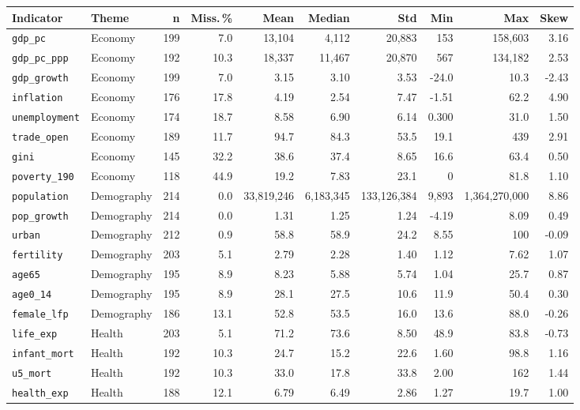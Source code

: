 \footnotesize
\begin{tabular}{llrrrrrrrr}
\toprule
Indicator & Theme & n & Miss.\,\% & Mean & Median & Std & Min & Max & Skew \\
\midrule
\texttt{gdp\_pc} & Economy & 199 & 7.0 & 13,104 & 4,112 & 20,883 & 153 & 158,603 & 3.16 \\
\texttt{gdp\_pc\_ppp} & Economy & 192 & 10.3 & 18,337 & 11,467 & 20,870 & 567 & 134,182 & 2.53 \\
\texttt{gdp\_growth} & Economy & 199 & 7.0 & 3.15 & 3.10 & 3.53 & -24.0 & 10.3 & -2.43 \\
\texttt{inflation} & Economy & 176 & 17.8 & 4.19 & 2.54 & 7.47 & -1.51 & 62.2 & 4.90 \\
\texttt{unemployment} & Economy & 174 & 18.7 & 8.58 & 6.90 & 6.14 & 0.300 & 31.0 & 1.50 \\
\texttt{trade\_open} & Economy & 189 & 11.7 & 94.7 & 84.3 & 53.5 & 19.1 & 439 & 2.91 \\
\texttt{gini} & Economy & 145 & 32.2 & 38.6 & 37.4 & 8.65 & 16.6 & 63.4 & 0.50 \\
\texttt{poverty\_190} & Economy & 118 & 44.9 & 19.2 & 7.83 & 23.1 & 0 & 81.8 & 1.10 \\
\texttt{population} & Demography & 214 & 0.0 & 33,819,246 & 6,183,345 & 133,126,384 & 9,893 & 1,364,270,000 & 8.86 \\
\texttt{pop\_growth} & Demography & 214 & 0.0 & 1.31 & 1.25 & 1.24 & -4.19 & 8.09 & 0.49 \\
\texttt{urban} & Demography & 212 & 0.9 & 58.8 & 58.9 & 24.2 & 8.55 & 100 & -0.09 \\
\texttt{fertility} & Demography & 203 & 5.1 & 2.79 & 2.28 & 1.40 & 1.12 & 7.62 & 1.07 \\
\texttt{age65} & Demography & 195 & 8.9 & 8.23 & 5.88 & 5.74 & 1.04 & 25.7 & 0.87 \\
\texttt{age0\_14} & Demography & 195 & 8.9 & 28.1 & 27.5 & 10.6 & 11.9 & 50.4 & 0.30 \\
\texttt{female\_lfp} & Demography & 186 & 13.1 & 52.8 & 53.5 & 16.0 & 13.6 & 88.0 & -0.26 \\
\texttt{life\_exp} & Health & 203 & 5.1 & 71.2 & 73.6 & 8.50 & 48.9 & 83.8 & -0.73 \\
\texttt{infant\_mort} & Health & 192 & 10.3 & 24.7 & 15.2 & 22.6 & 1.60 & 98.8 & 1.16 \\
\texttt{u5\_mort} & Health & 192 & 10.3 & 33.0 & 17.8 & 33.8 & 2.00 & 162 & 1.44 \\
\texttt{health\_exp} & Health & 188 & 12.1 & 6.79 & 6.49 & 2.86 & 1.27 & 19.7 & 1.00 \\

\end{tabular}
